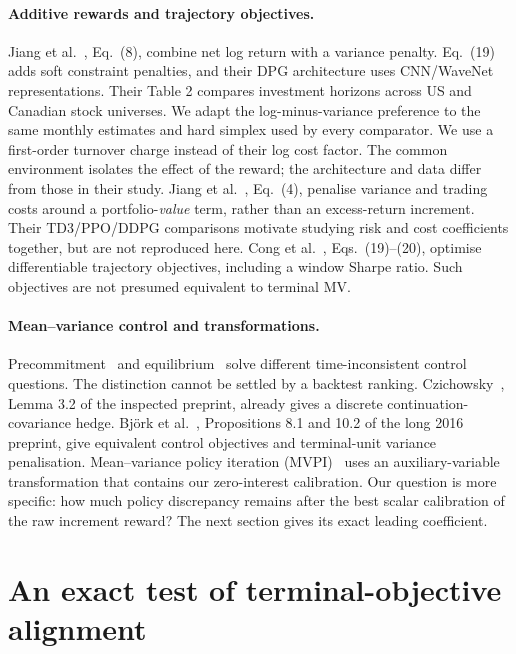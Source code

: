 \documentclass[sigconf,review]{acmart}
\begin{document}
\paragraph{Additive rewards and trajectory objectives.}
Jiang et al.\ \cite{jiang2025}, Eq.\ (8), combine net log return with a variance penalty. Eq.\ (19) adds soft constraint penalties, and their DPG architecture uses CNN/WaveNet representations. Their Table 2 compares investment horizons across US and Canadian stock universes. We adapt the log-minus-variance preference to the same monthly estimates and hard simplex used by every comparator. We use a first-order turnover charge instead of their log cost factor. The common environment isolates the effect of the reward; the architecture and data differ from those in their study. Jiang et al.\ \cite{jiang2024}, Eq.\ (4), penalise variance and trading costs around a portfolio-\emph{value} term, rather than an excess-return increment. Their TD3/PPO/DDPG comparisons motivate studying risk and cost coefficients together, but are not reproduced here. Cong et al.\ \cite{cong2026}, Eqs.\ (19)--(20), optimise differentiable trajectory objectives, including a window Sharpe ratio. Such objectives are not presumed equivalent to terminal MV.

\paragraph{Mean--variance control and transformations.}
Precommitment\ \cite{ling2000} and equilibrium\ \cite{basak2010,dai2023} solve different time-inconsistent control questions. The distinction cannot be settled by a backtest ranking. Czichowsky\ \cite{czichowsky2013}, Lemma 3.2 of the inspected preprint, already gives a discrete continuation-covariance hedge. Bj\"ork et al.\ \cite{bkm2016}, Propositions 8.1 and 10.2 of the long 2016 preprint, give equivalent control objectives and terminal-unit variance penalisation. Mean--variance policy iteration (MVPI)\ \cite{zhang2021} uses an auxiliary-variable transformation that contains our zero-interest calibration. Our question is more specific: how much policy discrepancy remains after the best scalar calibration of the raw increment reward? The next section gives its exact leading coefficient.

\section{An exact test of terminal-objective alignment}
\end{document}
